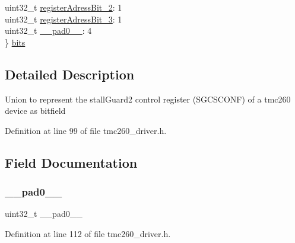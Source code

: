 \begin{DoxyCompactItemize}
\begin{tabbing}
\>uint32\_t \mbox{\hyperlink{uniontmc260___stall_guard2_control_register___abd6d1c957737511340b85f5c2d61f9ab}{registerAdressBit\_2}}: 1\\
\>uint32\_t \mbox{\hyperlink{uniontmc260___stall_guard2_control_register___a3da0387ab629039b91d051ab328910f0}{registerAdressBit\_3}}: 1\\
\>uint32\_t \mbox{\hyperlink{uniontmc260___stall_guard2_control_register___a3e57c2ef1c3ffb36722f000cc1156824}{\_\_pad0\_\_}}: 4\\
\} \mbox{\hyperlink{uniontmc260___stall_guard2_control_register___abdba31969268596a81e094d5f9f59c05}{bits}}\\

\end{tabbing}\end{DoxyCompactItemize}


\subsection{Detailed Description}
Union to represent the stall\+Guard2 control register (S\+G\+C\+S\+C\+O\+NF) of a tmc260 device as bitfield 

Definition at line 99 of file tmc260\+\_\+driver.\+h.



\subsection{Field Documentation}
\mbox{\label{uniontmc260___stall_guard2_control_register___a3e57c2ef1c3ffb36722f000cc1156824}} 
\subsubsection{\texorpdfstring{\+\_\+\+\_\+pad0\+\_\+\+\_\+}{\_\_pad0\_\_}}
{\footnotesize\ttfamily uint32\+\_\+t \+\_\+\+\_\+pad0\+\_\+\+\_\+}



Definition at line 112 of file tmc260\+\_\+driver.\+h.

\mbox{\label{uniontmc260___stall_guard2_control_register___abdba31969268596a81e094d5f9f59c05}} 
